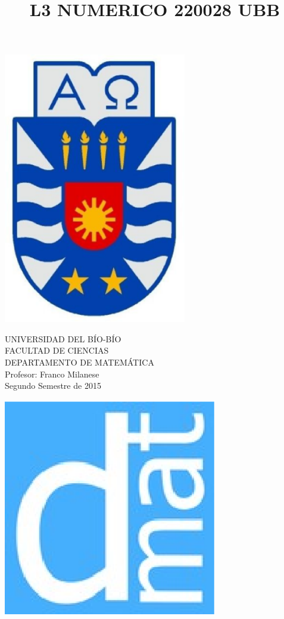 \documentclass[11pt]{article}
\begin{document}
\title{L3 NUMERICO 220028 UBB}

{\begin{minipage}{2cm}
\hspace*{1cm}\includegraphics[width=0.6\textwidth]{escubo-ubb.eps}
\end{minipage}
\begin{minipage}{12cm}
\small
{\bf \rm 
{
\begin{center}
{\footnotesize UNIVERSIDAD DEL B\'IO-B\'IO} \\
{\scriptsize FACULTAD DE CIENCIAS}  \\
{\scriptsize DEPARTAMENTO DE MATEM\'ATICA}  \\
{\scriptsize Profesor:  Franco Milanese}\\
{\scriptsize Segundo Semestre de 2015}
\end{center}
}}
\end{minipage}}
{\begin{minipage}{2cm}
\hspace*{-0.5cm}\vspace*{-0.05cm}\includegraphics[width=0.7\textwidth]{escudo-dmat.eps}
\end{minipage}}
\end{document}
